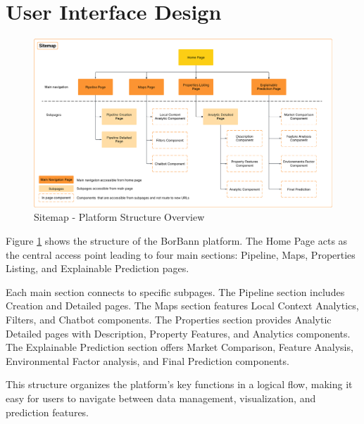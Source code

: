\clearpage
\section{User Interface Design}

\begin{figure}[htbp]
	\centering
	\includegraphics[width=1\textwidth]{assets/sitemap.png}
	\caption{Sitemap - Platform Structure Overview}
	\label{fig:sitemap}
\end{figure}

\noindent Figure \ref{fig:sitemap} shows the structure of the BorBann platform. The Home Page acts as the central access point leading to four main sections: Pipeline, Maps, Properties Listing, and Explainable Prediction pages. 

Each main section connects to specific subpages. The Pipeline section includes Creation and Detailed pages. The Maps section features Local Context Analytics, Filters, and Chatbot components. The Properties section provides Analytic Detailed pages with Description, Property Features, and Analytics components. The Explainable Prediction section offers Market Comparison, Feature Analysis, Environmental Factor analysis, and Final Prediction components.

This structure organizes the platform's key functions in a logical flow, making it easy for users to navigate between data management, visualization, and prediction features.

\pagebreak

